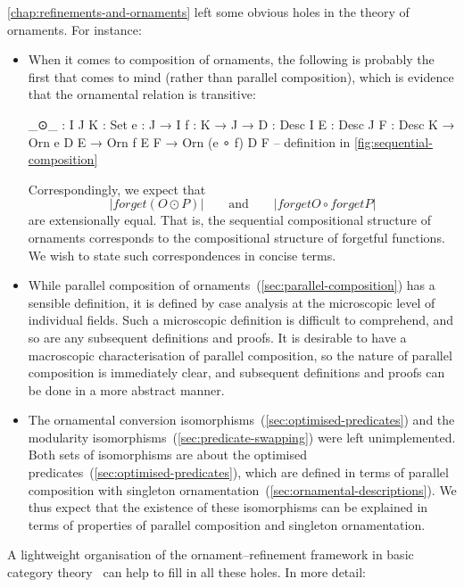 \autoref{chap:refinements-and-ornaments} left some obvious holes in the theory of ornaments.
For instance:
\begin{itemize}
\item When it comes to composition of ornaments, the following  is probably the first that comes to mind (rather than parallel composition), which is evidence that the ornamental relation is transitive:
\begin{code}
_⊙_ :  {I J K : Set} {e : J → I} {f : K → J} →
       {D : Desc I} {E : Desc J} {F : Desc K} →
       Orn e D E → Orn f E F → Orn (e ∘ f) D F
-- definition in \autoref{fig:sequential-composition}
\end{code}
Correspondingly, we expect that
\[ |forget (O ⊙ P)| \qquad\text{and}\qquad |forget O ∘ forget P| \]
are extensionally equal.
That is, the sequential compositional structure of ornaments corresponds to the compositional structure of forgetful functions.
We wish to state such correspondences in concise terms.
\item While parallel composition of ornaments~(\autoref{sec:parallel-composition}) has a sensible definition, it is defined by case analysis at the microscopic level of individual fields.
Such a microscopic definition is difficult to comprehend, and so are any subsequent definitions and proofs.
It is desirable to have a macroscopic characterisation of parallel composition, so the nature of parallel composition is immediately clear, and subsequent definitions and proofs can be done in a more abstract manner.
\item The ornamental conversion isomorphisms~(\autoref{sec:optimised-predicates}) and the modularity isomorphisms~(\autoref{sec:predicate-swapping}) were left unimplemented.
Both sets of isomorphisms are about the optimised predicates~(\autoref{sec:optimised-predicates}), which are defined in terms of parallel composition with singleton ornamentation~(\autoref{sec:ornamental-descriptions}).
We thus expect that the existence of these isomorphisms can be explained in terms of properties of parallel composition and singleton ornamentation.
\end{itemize}
A lightweight organisation of the ornament--refinement framework in basic category theory~\citep{MacLane-categories} can help to fill in all these holes.
In more detail:
